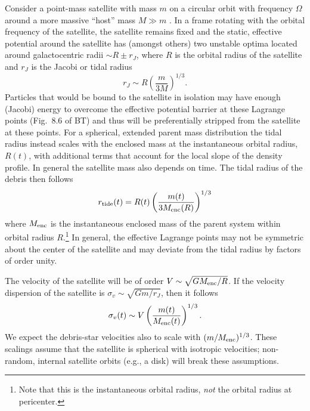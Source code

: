 \documentclass[letterpaper,12pt,preprint]{aastex}
\begin{document}
Consider a point-mass satellite with mass $m$ on a circular orbit with frequency $\Omega$ around a more massive ``host'' mass $M\gg m$ \citep[the ``restricted three-body problem''; e.g., \S 8.3][]{binneytremaine}. In a frame rotating with the orbital frequency of the satellite, the satellite remains fixed and the static, effective potential around the satellite has (amongst others) two unstable optima located around galactocentric radii $\sim R \pm r_J$, where $R$ is the orbital radius of the satellite and $r_J$ is the Jacobi or tidal radius
\begin{equation}
	r_J \sim R\left(\frac{m}{3M}\right)^{1/3}.\label{eq:ptmass}
\end{equation}
Particles that would be bound to the satellite in isolation may have enough (Jacobi) energy to overcome the effective potential barrier at these Lagrange points (Fig.~8.6 of BT) and thus will be preferentially stripped from the satellite at these points. For a spherical, extended parent mass distribution the tidal radius instead scales with the enclosed mass at the instantaneous orbital radius, $R(t)$, with additional terms that account for the local slope of the density profile. In general the satellite mass also depends on time. The tidal radius of the debris then follows
\begin{equation}
	r_{\rm tide}(t) = R(t)\left(\frac{m(t)}{3M_{\rm enc}(R)}\right)^{1/3}\label{eq:tidalradius}
\end{equation}
where $M_{\rm enc}$ is the instantaneous enclosed mass of the parent system within orbital radius $R$.\footnote{Note that this is the instantaneous orbital radius, \emph{not} the orbital radius at pericenter.}
In general, the effective Lagrange points may not be symmetric about the center of the satellite and may deviate from the tidal radius by factors of order unity. 

The velocity of the satellite will be of order $V\sim \sqrt{GM_{\rm enc}/R}$. If the velocity dispersion of the satellite is $\sigma_v \sim \sqrt{Gm/r_J}$, then it follows
\begin{equation}
	\sigma_v(t) \sim V\left(\frac{m(t)}{M_{\rm enc}(t)}\right)^{1/3}\label{eq:velscale}.
\end{equation}
We expect the debris-star velocities also to scale with $(m/M_{\rm enc})^{1/3}$. These scalings assume that the satellite is spherical with isotropic velocities; non-random, internal satellite orbits (e.g., a disk) will break these assumptions. 
\end{document}
